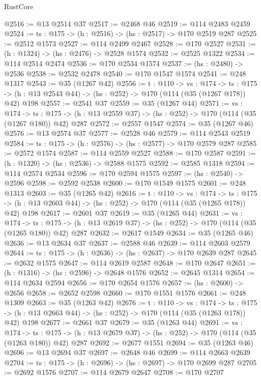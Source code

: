\begin{lexlean}{RustCore}
\begin{coremodule}
@2516 := @13 @2514 @37
@2517 := @2468 @46
@2519 := @114 @2483 @2459
@2524 := {ts : @175} -> (h : @2516) -> (hs : @2517) -> @170 @2519 @287
@2525 := @2512 @1573
@2527 := @114 @2499 @2467
@2528 := @170 @2527
@2531 := (h : @1324) -> (hs : @2476) -> @2528 @1574
@2532 := @2525 @1322
@2534 := @114 @2514 @2474
@2536 := @170 @2534 @1574
@2537 := (hs : @2480) -> @2536
@2538 := @2532 @2478
@2540 := @170 @1547 @1574
@2541 := @248 @1317
@2543 := @35 (@1267 @42)
@2556 := {t : @110} ->
  {vs : @174} ->
  {ts : @175} -> (h : @13 @2543 @44) -> (hs : @252) -> @170 (@114 (@35 (@1267 @178)) @42) @198
@2557 := @2541 @37
@2559 := @35 (@1267 @44)
@2571 := {vs : @174} ->
  {ts : @175} -> (h : @13 @2559 @37) -> (hs : @252) -> @170 (@114 (@35 (@1267 @180)) @42) @287
@2572 := @2557 @1547
@2574 := @35 (@1267 @46)
@2576 := @13 @2574 @37
@2577 := @2528 @46
@2579 := @114 @2543 @2519
@2584 := {ts : @175} -> (h : @2576) -> (hs : @2577) -> @170 @2579 @287
@2585 := @2572 @1574
@2587 := @114 @2559 @2527
@2588 := @170 @2587
@2591 := (h : @1320) -> (hs : @2536) -> @2588 @1575
@2592 := @2585 @1318
@2594 := @114 @2574 @2534
@2596 := @170 @2594 @1575
@2597 := (hs : @2540) -> @2596
@2598 := @2592 @2538
@2600 := @170 @1549 @1575
@2601 := @248 @1313
@2603 := @35 (@1265 @42)
@2616 := {t : @110} ->
  {vs : @174} ->
  {ts : @175} -> (h : @13 @2603 @44) -> (hs : @252) -> @170 (@114 (@35 (@1265 @178)) @42) @198
@2617 := @2601 @37
@2619 := @35 (@1265 @44)
@2631 := {vs : @174} ->
  {ts : @175} -> (h : @13 @2619 @37) -> (hs : @252) -> @170 (@114 (@35 (@1265 @180)) @42) @287
@2632 := @2617 @1549
@2634 := @35 (@1265 @46)
@2636 := @13 @2634 @37
@2637 := @2588 @46
@2639 := @114 @2603 @2579
@2644 := {ts : @175} -> (h : @2636) -> (hs : @2637) -> @170 @2639 @287
@2645 := @2632 @1575
@2647 := @114 @2619 @2587
@2648 := @170 @2647
@2651 := (h : @1316) -> (hs : @2596) -> @2648 @1576
@2652 := @2645 @1314
@2654 := @114 @2634 @2594
@2656 := @170 @2654 @1576
@2657 := (hs : @2600) -> @2656
@2658 := @2652 @2598
@2660 := @170 @1551 @1576
@2661 := @248 @1309
@2663 := @35 (@1263 @42)
@2676 := {t : @110} ->
  {vs : @174} ->
  {ts : @175} -> (h : @13 @2663 @44) -> (hs : @252) -> @170 (@114 (@35 (@1263 @178)) @42) @198
@2677 := @2661 @37
@2679 := @35 (@1263 @44)
@2691 := {vs : @174} ->
  {ts : @175} -> (h : @13 @2679 @37) -> (hs : @252) -> @170 (@114 (@35 (@1263 @180)) @42) @287
@2692 := @2677 @1551
@2694 := @35 (@1263 @46)
@2696 := @13 @2694 @37
@2697 := @2648 @46
@2699 := @114 @2663 @2639
@2704 := {ts : @175} -> (h : @2696) -> (hs : @2697) -> @170 @2699 @287
@2705 := @2692 @1576
@2707 := @114 @2679 @2647
@2708 := @170 @2707

\end{coremodule}
\end{lexlean}
